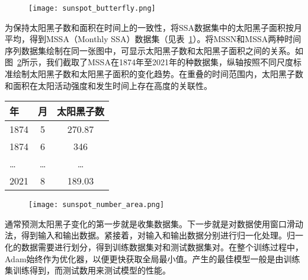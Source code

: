 \begin{figure}[!htbp]
    \centering
    \texttt{[image: sunspot\_butterfly.png]}
    \label{fig:sunspot_butterfly}
\end{figure}

为保持太阳黑子数和面积在时间上的一致性，将SSA数据集中的太阳黑子面积按月平均，得到MSSA（Monthly SSA）数据集（见表~\ref{tab:sunspot_area}）。将MSSN和MSSA两种时间序列数据集绘制在同一张图中，可显示太阳黑子数和太阳黑子面积之间的关系。如图~\ref{fig:sunspot_number_area}所示，我们截取了MSSA在1874年至2021年的种数据集，纵轴按照不同尺度标准绘制太阳黑子数和太阳黑子面积的变化趋势。在重叠的时间范围内，太阳黑子数和面积在太阳活动强度和发生时间上存在高度的关联性。

\begin{table}[!htbp]
    \label{tab:sunspot_area}
    \centering
    \footnotesize%
    \setlength{\tabcolsep}{4pt}
    \renewcommand{\arraystretch}{1.2}%
    \begin{tabular}{lcc}
        \hline
        年 & 月 & 太阳黑子数\\
        \hline
        1874 & 5 & 270.87 \\
        1874 & 6 & 346 \\
        \ldots & \ldots & \ldots \\
        2021 & 8 & 189.03 \\
        \hline
    \end{tabular}
\end{table}

\begin{figure}[!htbp]
    \centering
    \texttt{[image: sunspot\_number\_area.png]}
    \label{fig:sunspot_number_area}
\end{figure}

通常预测太阳黑子变化的第一步就是收集数据集。下一步就是对数据使用窗口滑动法，得到输入和输出数据。紧接着，对输入和输出数据分别进行归一化处理。归一化的数据需要进行划分，得到训练数据集对和测试数据集对。在整个训练过程中，Adam始终作为优化器，以便更快获取全局最小值。产生的最佳模型一般是由训练集训练得到，而测试数用来测试模型的性能。

